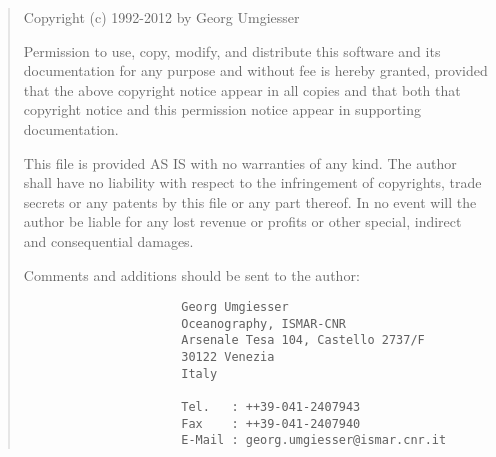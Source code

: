 
\begin{quotation}

   Copyright (c) 1992-2012 by Georg Umgiesser

   Permission to use, copy, modify, and distribute this software
   and its documentation for any purpose and without fee is hereby
   granted, provided that the above copyright notice appear in all
   copies and that both that copyright notice and this permission
   notice appear in supporting documentation.

   This file is provided AS IS with no warranties of any kind.
   The author shall have no liability with respect to the
   infringement of copyrights, trade secrets or any patents by
   this file or any part thereof.  In no event will the author
   be liable for any lost revenue or profits or other special,
   indirect and consequential damages.

   Comments and additions should be sent to the author:

        \begin{verbatim}
                      Georg Umgiesser                                  
                      Oceanography, ISMAR-CNR
                      Arsenale Tesa 104, Castello 2737/F
                      30122 Venezia
                      Italy

                      Tel.   : ++39-041-2407943
                      Fax    : ++39-041-2407940
                      E-Mail : georg.umgiesser@ismar.cnr.it
        \end{verbatim}
\end{quotation}

